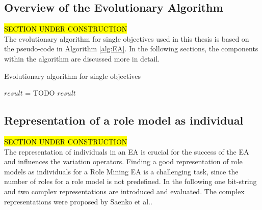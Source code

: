     \subsection{Overview of the Evolutionary Algorithm}
    \hl{SECTION UNDER CONSTRUCTION}\\
    The evolutionary algorithm for single objectives used in this thesis is based on the pseudo-code in Algorithm \ref{alg:EA}. In the following sections, the components within the algorithm are discussed more in detail.
    \begin{algorithm}
        \caption{Evolutionary algorithm for single objectives}
        \label{alg:EA}
        \begin{algorithmic}[1]
                \State $result$ = TODO
                \State \Return $result$
            \EndProcedure
        \end{algorithmic}
    \end{algorithm}

    \subsection{Representation of a role model as individual}   
    \hl{SECTION UNDER CONSTRUCTION}\\
    The representation of individuals in an EA is crucial for the success of the EA and influences the variation operators. Finding a good representation of role models as individuals for a Role Mining EA is a challenging task, since the number of roles for a role model is not predefined. In the following one bit-string and two complex representations are introduced and evaluated. The complex representations were proposed by Saenko et al.\cite{saenko2012design}.
